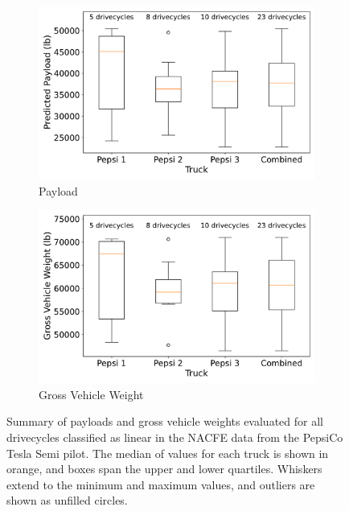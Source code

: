 \begin{figure}[H]
    \centering
    \begin{subfigure}[b]{0.49\textwidth}
        \centering
        \includegraphics[width=\textwidth]{figures/payload_distribution.pdf}
        \caption{Payload}
        \label{fig:payload_distribution}
    \end{subfigure}
    \hfill
    \begin{subfigure}[b]{0.49\textwidth}
        \centering
        \includegraphics[width=\textwidth]{figures/gvw_distribution.pdf}
        \caption{Gross Vehicle Weight}
        \label{fig:gvw_distribution}
    \end{subfigure}
    \caption{Summary of payloads and gross vehicle weights evaluated for all drivecycles classified as linear in the NACFE data from the PepsiCo Tesla Semi pilot. The median of values for each truck is shown in orange, and boxes span the upper and lower quartiles. Whiskers extend to the minimum and maximum values, and outliers are shown as unfilled circles.}
    \label{fig:payload_gvw_distributions}
\end{figure}

